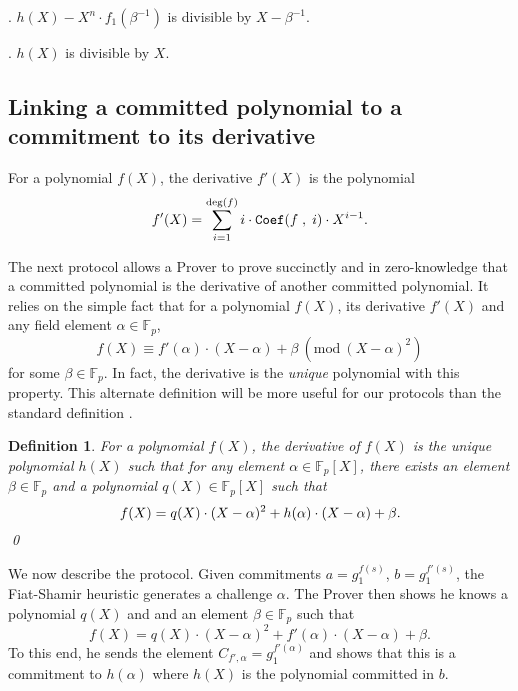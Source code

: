 \documentclass[11pt, lettersize, notitlepage, leqno, footskip=0.6cm]{article}
\newcommand{\bFp}{\mathbb{F}_p}
\newcommand{\al}{\alpha}
\newcommand{\be}{\beta}
\newcommand{\vs}{\vspace{-0.15cm}}
\newcommand{\noin}{\noindent}
\newcommand{\Mod}[1]{\ (\mathrm{mod}\ #1)}
\newtheorem{Def}{Definition}[section]
\numberwithin{equation}{section}
\begin{document}
\noin 1. $h(X) - X^n\cdot f_1(\be^{-1})$ is divisible by $X-\be^{-1}$. \vspace{1mm}

\noin 2. $h(X)$ is divisible by $X$. \vspace{2mm}

\subsection{\fontsize{11}{11}\selectfont Linking a committed polynomial to a commitment to its derivative}


For a polynomial $f(X)$, the derivative $f'(X)$ is the polynomial \vs $$f'(X) = \sum\limits_{i=1}^{\deg(f)} i\cdot {\tt{Coef}}(f\;,\;i)\cdot X^{i-1}. \vs $$

\noin The next protocol allows a Prover to prove succinctly and in zero-knowledge that  a committed polynomial is the derivative of another committed polynomial. It relies on the simple fact that for a polynomial $f(X)$, its derivative $f'(X)$ and any field element $\al\in \bFp$,  $$ f(X) \equiv f'(\al)\cdot (X-\al) + \be  \Mod{(X-\al)^2}  $$ for some $\be \in \bFp$. In fact, the derivative is the \textit{unique} polynomial with this property. This alternate definition will be more useful for our protocols than the standard definition .

\begin{comment} In fact, the derivative of $f(X)$ can be alternatively defined as the unique polynomial $h(X)$ such that for any $\al\in \bFp$, there exists an element $\be\in \bFp$ such that \vs $$ f(X)\equiv h(\al)(X-\al) + \be\Mod{(X-\al)^2}. \vs $$  \end{comment}


\begin{Def} \normalfont For a polynomial $f(X)$, \textit{the derivative} of $f(X)$ is the unique polynomial $h(X)$ such that for any element $\al\in \bFp[X]$, there exists an element $\be\in \bFp$ and a polynomial $q(X)\in \bFp[X]$ such that $$ f(X) = q(X)\cdot (X-\al)^2 + h(\al)\cdot (X-\al)+\be. \vspace{-7mm} $$ \qed \end{Def}


We now describe the protocol. Given commitments $a = g_1^{f(s)}$, $b = g_1^{f'(s)}$, the Fiat-Shamir heuristic generates a challenge $\al$. The Prover then shows he knows a polynomial $q(X)$ and and an element $\be\in \bFp$ such that $$ f(X) = q(X)\cdot (X-\al)^2 + f'(\al)\cdot(X-\al)+\be. $$ To this end, he sends the element $C_{f',\al} =  g_1^{f'(\al)}$ and shows that this is a commitment to $h(\al)$ where $h(X)$ is the polynomial committed in $b$.    
\end{document}
